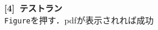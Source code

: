 \documentclass{ujarticle}
\begin{document}
\begin{enumerate}[\bf\large 1.]
\begin{enumerate}[(1)]
\vspace{77mm}

{\bf [4]\ テストラン}\\
\hspace*{10mm}\verb|Figure|を押す．pdfが表示されれば成功
  \end{enumerate}

\end{enumerate}
\end{document}

